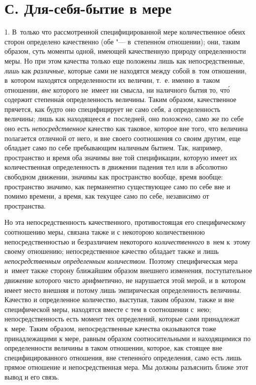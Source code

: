 \section[С. Для-себя-бытие в мере]{С. Для-себя-бытие в мере}

1. В~только что рассмотренной специфицированной мере количественное обеих
сторон определено качественно (обе "--- в~степенн\'{о}м отношении); они, таким
образом, суть моменты одной, имеющей качественную природу определенности меры.
Но при этом качества только еще положены лишь как непосредственные, {\em лишь}
как {\em различные}, которые сами не находятся между собой в~том отношении,
в~котором находятся определенности их величин, т.~е. именно в~таком отношении,
{\em вне} которого не~имеет ни смысла, ни наличного бытия то, чт\'{о} содержит
степенн\'{а}я определенность величины. Таким образом, качественное прячется,
как будто оно специфицирует не само себя, а определенность величины; лишь как
находящееся {\em в}~последней, оно {\em положено}, само же по себе оно есть
{\em непосредственное} качество как таковое, которое вне того, что величина
полагается отличной от него, и вне своего соотношения со своим другим, еще
обладает само по себе пребывающим наличным бытием. Так, например, пространство
и время оба значимы вне той спецификации, которую имеет их количественная
определенность в движении падения тел или в абсолютно свободном движении,
значимы как пространство вообще, время вообще: пространство значимо, как
перманентно существующее само по себе вне и помимо времени, а время, как
текущее само по себе, независимо от пространства.

Но эта непосредственность качественного, противостоящая его специфическому
соотношению меры, связана также и с некоторою количественною
непосредственностью и безразличием некоторого {\em количественного} в~нем
к~этому своему отношению; непосредственное качество обладает также и лишь
{\em непосредственным определенным количеством}. Поэтому специфическая мера
и~имеет также сторону ближайшим образом внешнего изменения, поступательное
движение которого чисто арифметично, не нарушается этой мерой, и в~котором
имеет место внешняя и потому лишь эмпирическая определенность величины.
Качество и определенное количество, выступая, таким образом, также и вне
специфической меры, находятся вместе с тем в соотношении с~нею;
непосредственность есть момент тех определений, которые сами принадлежат
к~мере. Таким образом, непосредственные качества оказываются тоже
принадлежащими к мере, равным образом соотносительными и находящимися по
определенности величины в таком отношении, которое, как стоящее вне
специфицированного отношения, вне степенн\'{о}го определения, само есть лишь
прямое отношение и непосредственная мера. Мы должны разъяснить ближе этот
вывод и его связь.

